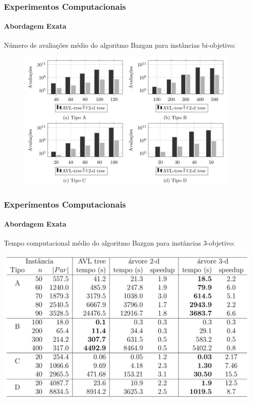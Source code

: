 \documentclass[10pt,xcolor=table,fleqn]{beamer}
\begin{document}
\begin{frame}
  \frametitle{Experimentos Computacionais}
  \framesubtitle{Abordagem Exata}
  Número de avaliações médio do algoritmo Bazgan para instâncias bi-objetivo:
  \begin{figure}[H]
    \includegraphics[scale=0.3]{../tab/cmp/2dim}
  \end{figure}
\end{frame}

\begin{frame}
  \frametitle{Experimentos Computacionais}
  \framesubtitle{Abordagem Exata}
  Tempo computacional médio do algoritmo Bazgan para instâncias $3$-objetivo:
  \scriptsize
  \begin{table}[h]
    \includegraphics[scale=0.25]{../tab/cpu3dim}
  \end{table}
\end{frame}
\end{document}
